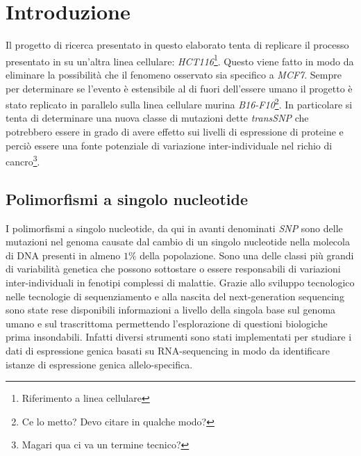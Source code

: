 \chapter{Introduzione}
\label{cha:intro}




Il progetto di ricerca presentato in questo elaborato tenta di replicare il processo presentato in \cite{transsnp} su un'altra linea cellulare: \emph{HCT116}\footnote{Riferimento a linea cellulare}.
Questo viene fatto in modo da eliminare la possibilit\`a che il fenomeno osservato sia specifico a \emph{MCF7}.
Sempre per determinare se l'evento \`e estensibile al di fuori dell'essere umano il progetto \`e stato replicato in parallelo sulla linea cellulare murina \emph{B16-F10}\footnote{Ce lo metto? Devo citare in qualche modo?}.
In particolare si tenta di determinare una nuova classe di mutazioni dette \emph{transSNP} che potrebbero essere in grado di avere effetto sui livelli di espressione di proteine e perci\`o essere una fonte potenziale di variazione inter-individuale nel richio di cancro\footnote{Magari qua ci va un termine tecnico?}.

\section{Polimorfismi a singolo nucleotide}
I polimorfismi a singolo nucleotide, da qui in avanti denominati \emph{SNP} sono delle mutazioni nel genoma causate dal cambio di un singolo nucleotide nella molecola di DNA presenti in almeno $1\%$ della popolazione.
Sono una delle classi pi\`u grandi di variabilit\`a genetica che possono sottostare o essere responsabili di variazioni inter-individuali in fenotipi complessi di malattie.
Grazie allo sviluppo tecnologico nelle tecnologie di sequenziamento e alla nascita del next-generation sequencing sono state rese disponibili informazioni a livello della singola base sul genoma umano e sul trascrittoma permettendo l'esplorazione di questioni biologiche prima insondabili.
Infatti diversi strumenti sono stati implementati per studiare i dati di espressione genica basati su RNA-sequencing in modo da identificare istanze di espressione genica allelo-specifica.


